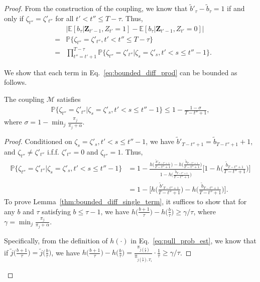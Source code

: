 \begin{proof}
From the construction of the coupling, we know that $\tilde{b}'_{\tau}- \tilde{b}_{\tau} = 1$ if and only if $\zeta_{t''} = \zeta'_{t''}$ for all $t' <t''  \leq T-\tau$. Thus,
\begin{eqnarray}\label{eq:bounded_diff_prod}
&&\big|\mathbb{E}[b_\tau | \boldsymbol{Z}_{t'-1}, Z_{t'} =1] - \mathbb{E}[b_{\tau}|\boldsymbol{Z}_{t'-1}, Z_{t'} = 0]\big| \nonumber\\
&=& \mathbb{P}\big\{\zeta_{t''} = \zeta'_{t''},  t' <t''  \leq T-\tau\big\} \nonumber\\
&=& \prod_{t'' = t'+1}^{T-\tau}\mathbb{P}\big\{\zeta_{t''} = \zeta'_{t''}|\zeta_{s} = \zeta'_{s},  t' < s  \leq t''-1\big\}.
\end{eqnarray}

We show that each term in Eq.~\eqref{eq:bounded_diff_prod} can be bounded as follows.
\begin{lemma} \label{thm:bounded_diff_single_term}
The coupling $\mathcal{M}$ satisfies
\begin{eqnarray}
\mathbb{P}\big\{\zeta_{t''} = \zeta'_{t''}|\zeta_{s} = \zeta'_{s},  t' < s  \leq t''-1\big\} \leq 1 - \frac{1-\sigma}{T-t''+1}, \nonumber
\end{eqnarray}
where $\sigma = 1-\min_j \frac{\pi_j}{\pi_j + \alpha}$.
\end{lemma}
\begin{proof}
Conditioned on $\zeta_{s} = \zeta'_{s},  t' < s  \leq t''-1$, we have $\tilde{b}'_{T-t''+1} = \tilde{b}_{T-t''+1} + 1$, and $\zeta_{t''} \neq \zeta'_{t''}$ i.f.f. $\zeta'_{t''} = 0$ and $\zeta_{t''} = 1$. Thus,
\begin{align}
\mathbb{P}\big\{\zeta_{t''} = \zeta'_{t''}|\zeta_{s} = \zeta'_{s},  t' < s  \leq t''-1\big\}
&=1- \frac{h\big(\frac{\tilde{b}'_{T-t''+1}}{T-t''+1}\big) - h\big(\frac{\tilde{b}_{T-t''+1}}{T-t''+1}\big)}{1- h\big(\frac{\tilde{b}_{T-t''+1}}{T-t''+1}\big)}\bigg[1 - h\big(\frac{\tilde{b}_{T-t''+1}}{T-t''+1}\big)\bigg] \nonumber\\
&= 1- \bigg[h\big(\frac{\tilde{b}'_{T-t''+1}}{T-t''+1}\big) - h\big(\frac{\tilde{b}_{T-t''+1}}{T-t''+1}\big) \bigg].
\end{align}
To prove Lemma~\ref{thm:bounded_diff_single_term}, it suffices to show that for any $b$ and $\tau$ satisfying $b \leq \tau -1$, we have $h\big(\frac{b+1}{\tau}\big) - h\big(\frac{b}{\tau}\big) \geq \gamma/\tau$, where $\gamma = \min_j \frac{\pi_j}{\pi_j + \alpha}$.

Specifically, from the definition of $h(\cdot)$ in Eq.~\eqref{eq:pull_prob_est}, we know that if $\tilde{j}\big(\frac{b+1}{\tau}\big) = \tilde{j}\big(\frac{b}{\tau}\big)$, we have $h\big(\frac{b+1}{\tau}\big) - h\big(\frac{b}{\tau}\big) = \frac{\pi_{\tilde{j}(\frac{b}{\tau})}}{\hat{\pi}_{\tilde{j}(\frac{b}{\tau}), T_1}}\cdot \frac{1}{\tau} \geq \gamma/\tau$.


\end{proof}
\end{proof}
